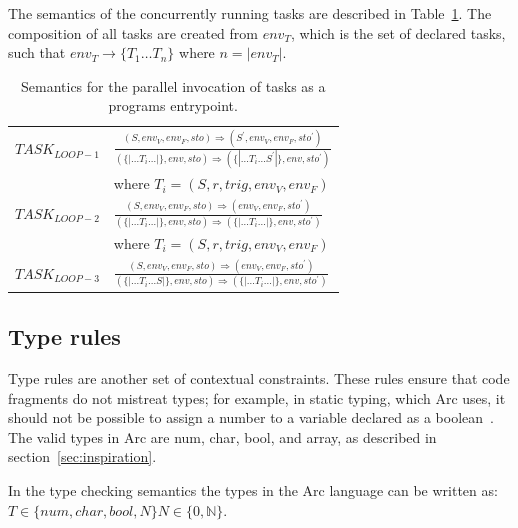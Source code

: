 The semantics of the concurrently running tasks are described in Table~\ref{tab:taskinvocation}. The composition of all tasks are created from $env_T$, which is the set of declared tasks, such that $env_T \rightarrow \{T_1 \dots T_n \}$ where $n = |env_T|$.


\begin{table}[htb!]
    \centering
    \begin{tabular}{ll}
        \toprule
        $TASK_{LOOP-1}$ & $\frac
            {(S, env_V, env_F, sto) \Rightarrow (S^\prime, env_V, env_F, sto^\prime)}
            {(\{|\dots T_i \dots|\}, env, sto) \Rightarrow (\{|\dots T_i \dots S^\prime|\}, env, sto^\prime)}$ \\ [12pt]
                        & where $T_i = (S, r, trig, env_V, env_F)$                                             \\ [12pt]
        $TASK_{LOOP-2}$ & $\frac
            {(S, env_V, env_F, sto) \Rightarrow (env_V, env_F, sto^\prime)}
            {(\{|\dots T_i \dots|\}, env, sto) \Rightarrow (\{|\dots T_i \dots|\}, env, sto^\prime)}$          \\ [12pt]
                        & where $T_i = (S, r, trig, env_V, env_F)$                                             \\ [12pt]
        $TASK_{LOOP-3}$ & $\frac
            {(S, env_V, env_F, sto) \Rightarrow (env_V, env_F, sto^\prime)}
            {(\{|\dots T_i \dots S|\}, env, sto) \Rightarrow (\{|\dots T_i \dots|\}, env, sto^\prime)}$        \\
        \bottomrule
    \end{tabular}
    \caption{Semantics for the parallel invocation of tasks as a programs entrypoint.}
    \label{tab:taskinvocation}
\end{table}



\subsection{Type rules}\label{subsec:typerules}
Type rules are another set of contextual constraints. These rules ensure that code fragments do not mistreat types; for example, in static typing, which Arc uses, it should not be possible to assign a number to a variable declared as a boolean~\cite{Sebesta2016}. The valid types in Arc are num, char, bool, and array, as described in section~\ref{sec:inspiration}.

In the type checking semantics the types in the Arc language can be written as:
$T \in \{num, char, bool, N\} N \in \{ 0,\mathbb{N}\}$.


